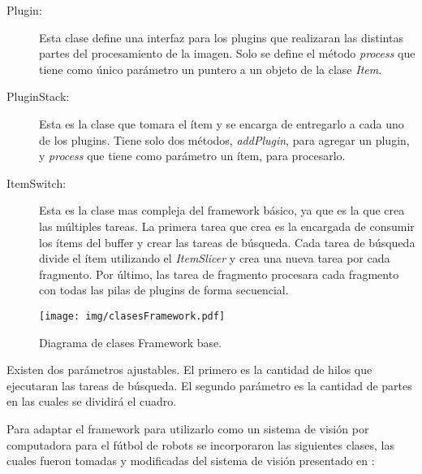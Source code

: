 \begin{description}
\item[Plugin:] Esta clase define una interfaz para los plugins que realizaran
	las distintas partes del procesamiento de la imagen. Solo se define el
	método \emph{process} que tiene como único parámetro un puntero a un
	objeto de la clase \emph{Item}.

\item[PluginStack:] Esta es la clase que tomara el ítem y se encarga de
	entregarlo a cada uno de los plugins. Tiene solo dos métodos,
	\emph{addPlugin}, para agregar un plugin, y \emph{process} que tiene
	como parámetro un ítem, para procesarlo.

\item[ItemSwitch:] Esta es la clase mas compleja del framework básico, ya que es
	la que crea las múltiples tareas. La primera tarea que crea es la
	encargada de consumir los ítems del buffer y crear las tareas de
	búsqueda. Cada tarea de búsqueda divide el ítem utilizando el
	\emph{ItemSlicer} y crea una nueva tarea por cada fragmento. Por último,
	las tarea de fragmento procesara cada fragmento con todas las pilas de
	plugins de forma secuencial.

\end{description}

\begin{figure}[h]

	\texttt{[image: img/clasesFramework.pdf]}

	\caption{Diagrama de clases Framework base.}

\end{figure}

Existen dos parámetros ajustables. El primero es la cantidad de hilos que
ejecutaran las tareas de búsqueda. El segundo parámetro es la cantidad de partes
en las cuales se dividirá el cuadro.

Para adaptar el framework para utilizarlo como un sistema de visión por
computadora para el fútbol de robots se incorporaron las siguientes clases, las
cuales fueron tomadas y modificadas del sistema de visión presentado en
\cite{torres2014}:

